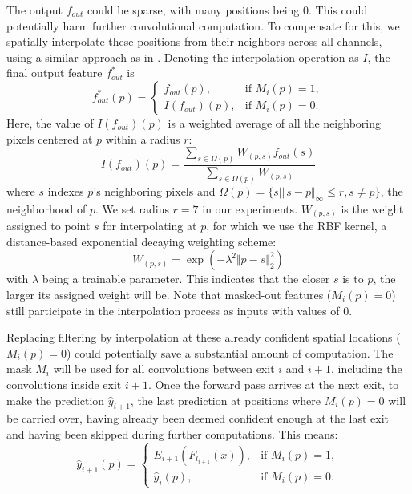 \documentclass{article} %
\renewcommand{\cite}{\citep}
\begin{document}
The output $f_{out}$ could be sparse, with many positions being $0$. 
This could potentially harm further convolutional computation.
To compensate for this, we spatially interpolate these positions from their neighbors across all channels, using a similar approach as in \cite{xie2020spatially}.
Denoting the interpolation operation as $I$, the final output feature $f^*_{out}$ is 
\begin{equation}
f^*_{out}(p)  = 
\begin{cases}
    f_{out}(p), & \text{if } M_i(p) = 1, \\
    I(f_{out})(p),  & \text{if } M_i(p) = 0.
\end{cases}
\end{equation}
Here, the value of $I(f_{out})(p)$ is a weighted average of all the neighboring pixels centered at $p$ within a radius $r$:
\begin{equation}
I(f_{out})(p) = \frac{\sum_{s\in{\Omega(p)}} W_{(p, s)} f_{out}(s)}{\sum_{s\in{\Omega(p)}} W_{(p, s)}}
\end{equation}
where $s$ indexes $p$'s neighboring pixels and $\Omega(p) = \{s | \Vert s-p\Vert_{\infty} \leq r, s \neq p\}$, the neighborhood of $p$. We set radius $r=7$ in our experiments. $W_{(p,s)}$ is the weight assigned to point $s$ for interpolating at $p$, for which we use the RBF kernel, a distance-based exponential decaying weighting scheme:
\begin{equation}
\label{eqn:lambda}
W_{(p,s)} = \exp{(-\lambda^2 \Vert p - s \Vert ^2_2)}
\end{equation}
with $\lambda$ being a trainable parameter.
This indicates that the closer $s$ is to $p$, the larger its assigned weight will be. Note that masked-out features ($M_i(p) = 0$) still participate in the interpolation process as inputs with values of 0.


Replacing filtering by interpolation at these already confident spatial locations ($M_i(p) = 0$) could potentially save a substantial amount of computation.
The mask $M_i$ will be used for all convolutions between exit $i$ and $i+1$, including the convolutions inside exit $i+1$.
Once the forward pass arrives at the next exit, to make the prediction $\hat{y}_{i+1}$, the last prediction at positions where $M_i(p) = 0$ will be carried over, having already been deemed confident enough at the last exit and having been skipped during further computations.
This means:
\begin{equation}
\label{eqn:carry}
\hat{y}_{i+1}(p)  = 
\begin{cases}
    E_{i+1}(F_{l_{i+1}}(x)), & \text{if } M_i(p) = 1, \\
    \hat{y}_{i}(p),  & \text{if } M_i(p) = 0.
\end{cases}
\end{equation}
\end{document}
